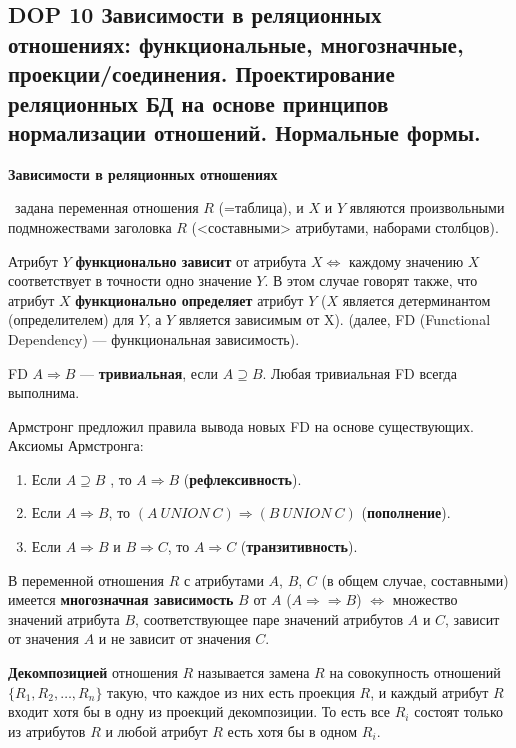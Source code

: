 \subsection*{DOP 10 Зависимости  в  реляционных  отношениях:  функциональные,  многозначные,  проекции/соединения. Проектирование реляционных БД на основе принципов нормализации отношений. Нормальные формы.}

\textbf{Зависимости в реляционных отношениях}

\mathLet \ задана переменная отношения $R$ (=таблица), и $X$ и $Y$ являются произвольными подмножествами заголовка $R$ (<составными> атрибутами, наборами столбцов).

Атрибут $Y$ \textbf{функционально зависит} от атрибута $X \iff$ каждому значению $X$ соответствует в точности одно значение $Y$.
В этом случае говорят также, что атрибут $X$ \textbf{функционально определяет} атрибут $Y$ ($X$ является детерминантом (определителем) для $Y$, а $Y$ является зависимым от X). (далее, FD (Functional Dependency) --- функциональная зависимость).

FD $A \Rightarrow B$ --- \textbf{тривиальная}, если $A \supseteq B$.
Любая тривиальная FD всегда выполнима.

Армстронг предложил правила вывода новых FD на основе существующих.
Аксиомы Армстронга:
\begin{enumerate}
    \item Если $A \supseteq B$ , то $A \Rightarrow B$ (\textbf{рефлексивность}).
    \item Если $A \Rightarrow B$, то $(A~UNION~C) \Rightarrow (B~UNION~C)$ (\textbf{пополнение}).
    \item Если $A \Rightarrow B$ и $B \Rightarrow C$, то $A \Rightarrow C$ (\textbf{транзитивность}).
\end{enumerate}


В переменной отношения $R$ с атрибутами $A$, $B$, $C$ (в общем случае, составными) имеется \textbf{многозначная зависимость} $B$ от $A$ ($A \Rightarrow\Rightarrow B$) $\iff$ множество значений атрибута $B$, соответствующее паре значений атрибутов $A$ и $C$, зависит от значения $A$ и не зависит от значения $C$.

\textbf{Декомпозицией} отношения $R$ называется замена $R$ на совокупность отношений $\{R_1, R_2, \dots , R_n\}$ такую, что каждое из них есть проекция $R$, и каждый атрибут $R$ входит хотя бы в одну из проекций декомпозиции.
То есть все $R_i$ состоят только из атрибутов $R$ и любой атрибут $R$ есть хотя бы в одном $R_i$.

